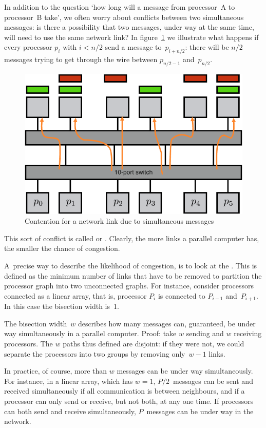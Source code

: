 In addition to the question `how long will a message from processor~A
to processor~B take', we often worry about conflicts between two
simultaneous messages: is there a possibility that two messages, under
way at the same time, will need to use the same network link? In
figure~\ref{fig:contention} we illustrate what happens if every
processor $p_i$ with $i<n/2$ send a message to~$p_{i+n/2}$: there will
be $n/2$ messages trying to get through the wire between $p_{n/2-1}$
and~$p_{n/2}$.
\begin{figure}[ht]
  \includegraphics[scale=.09]{graphics/contention}
  \caption{Contention for a network link due to simultaneous messages}
  \label{fig:contention}
\end{figure}
This
sort of conflict is called  or
. Clearly, the more links a
parallel computer has, the smaller the chance of congestion.

A~precise way to describe the likelihood of congestion, is
to look at the . This is defined as the
minimum number of links that have to be removed to partition the
processor graph into two unconnected graphs. For instance, consider
processors connected as a linear array, that is, processor $P_i$ is
connected to $P_{i-1}$ and~$P_{i+1}$. In this case the bisection width
is~1.

The bisection width~$w$ describes how many messages can, guaranteed,
be under way simultaneously in a parallel computer. Proof: take $w$
sending and $w$ receiving processors. The $w$ paths thus defined are
disjoint: if they were not, we could separate the processors into two
groups by removing only~$w-1$ links. 

In practice, of course, more than
$w$ messages can be under way simultaneously. For instance, in a
linear array, which has $w=1$, $P/2$~messages can be sent and received
simultaneously if all communication is between neighbours, and if a
processor can only send or receive, but not both, at any one time. If
processors can both send and receive simultaneously, $P$~messages can
be under way in the network.

